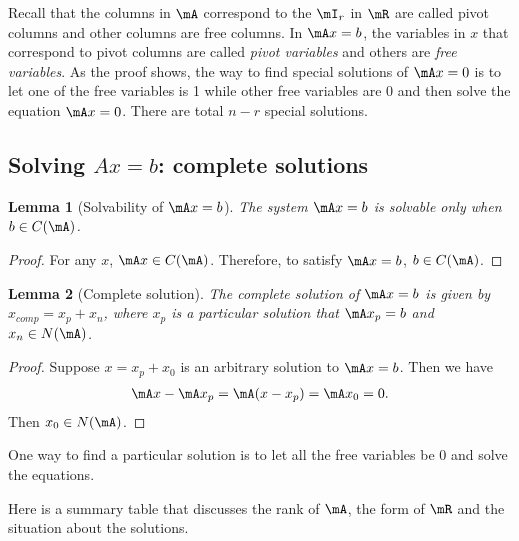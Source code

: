\documentclass[11pt]{article}
\theoremstyle{plain}
\newtheorem{lem}{Lemma}
\theoremstyle{definition}
\begin{document}
Recall that the columns in $\mA$ correspond to the $\mI_r$ in $\mR$ are called pivot columns and other columns are free columns. In $\mA x = b$, the variables in $x$ that correspond to pivot columns are called \textit{pivot variables} and others are \textit{free variables}. As the proof shows, the way to find special solutions of $\mA x = 0$ is to let one of the free variables is 1 while other free variables are 0 and then solve the equation $\mA x = 0$. There are total $n-r$ special solutions.


\subsection{Solving $Ax = b$: complete solutions}

\begin{lem}[Solvability of $\mA x = b$]\label{lem:solve} The system $\mA x = b$ is solvable only when $b \in C(\mA)$.	
\end{lem}

\begin{proof}
	For any $x$, $\mA x \in C(\mA)$. Therefore, to satisfy $\mA x = b$, $b \in C(\mA)$. 
\end{proof}

\begin{lem}[Complete solution]\label{lem:compsolu} The complete solution of $\mA x = b$ is given by $x_{comp} = x_p + x_n$, where $x_p$ is a particular solution that $\mA x_p = b$ and $x_n \in N(\mA)$. 
\end{lem}

\begin{proof}
	Suppose $x = x_p + x_0$ is an arbitrary solution to $\mA x= b$. Then we have 
	\begin{align}
		\mA x - \mA x_p = \mA (x- x_p) = \mA x_0 = 0.
	\end{align}
	Then $x_0 \in N(\mA)$.
\end{proof}

One way to find a particular solution is to let all the free variables be 0 and solve the equations. 

\vspace{.2cm}
Here is a summary table that discusses the rank of $\mA$, the form of $\mR$ and the situation about the solutions.
\end{document}
